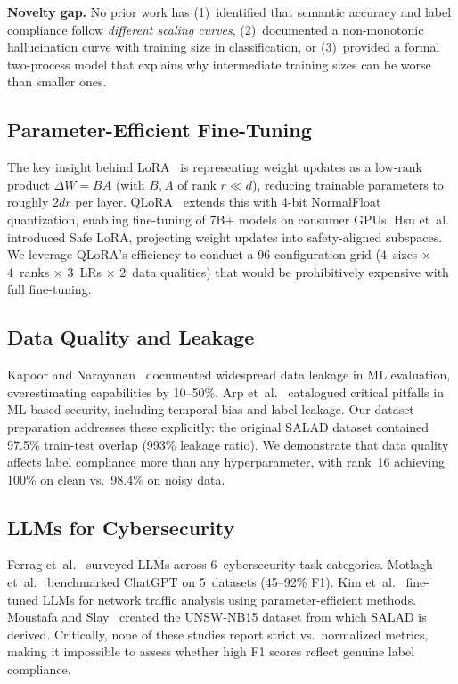 \documentclass[review,3p]{elsarticle}
\begin{document}
\textbf{Novelty gap.} No prior work has (1)~identified that semantic accuracy and label compliance follow \emph{different scaling curves}, (2)~documented a non-monotonic hallucination curve with training size in classification, or (3)~provided a formal two-process model that explains why intermediate training sizes can be worse than smaller ones.


\subsection{Parameter-Efficient Fine-Tuning}
The key insight behind LoRA~\cite{hu2022} is representing weight updates as a low-rank product $\Delta W = BA$ (with $B, A$ of rank $r \ll d$), reducing trainable parameters to roughly $2dr$ per layer. QLoRA~\cite{dettmers2023} extends this with 4-bit NormalFloat quantization, enabling fine-tuning of 7B+ models on consumer GPUs. Hsu et~al.~\cite{safelora2024} introduced Safe LoRA, projecting weight updates into safety-aligned subspaces. We leverage QLoRA's efficiency to conduct a 96-configuration grid (4~sizes $\times$ 4~ranks $\times$ 3~LRs $\times$ 2~data qualities) that would be prohibitively expensive with full fine-tuning.

\subsection{Data Quality and Leakage}
Kapoor and Narayanan~\cite{kapoor2023} documented widespread data leakage in ML evaluation, overestimating capabilities by 10--50\%. Arp et~al.~\cite{arp2022} catalogued critical pitfalls in ML-based security, including temporal bias and label leakage. Our dataset preparation addresses these explicitly: the original SALAD dataset contained 97.5\% train-test overlap (993\% leakage ratio). We demonstrate that data quality affects label compliance more than any hyperparameter, with rank~16 achieving 100\% on clean vs.\ 98.4\% on noisy data.

\subsection{LLMs for Cybersecurity}
Ferrag et~al.~\cite{ferrag2024} surveyed LLMs across 6~cybersecurity task categories. Motlagh et~al.~\cite{motlagh2024} benchmarked ChatGPT on 5~datasets (45--92\% F1). Kim et~al.~\cite{kim2024} fine-tuned LLMs for network traffic analysis using parameter-efficient methods. Moustafa and Slay~\cite{moustafa2016} created the UNSW-NB15 dataset from which SALAD is derived. Critically, none of these studies report strict vs.\ normalized metrics, making it impossible to assess whether high F1 scores reflect genuine label compliance.
\end{document}
